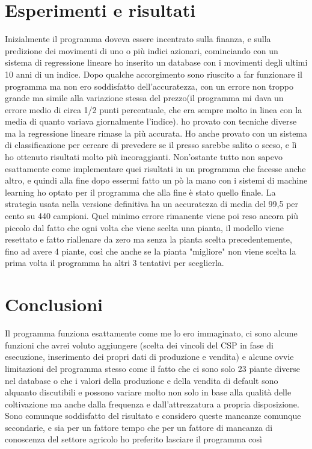 \documentclass[11pt]{article}
\begin{document}
\section{Esperimenti e risultati}
Inizialmente il programma doveva essere incentrato sulla finanza, e sulla predizione dei movimenti di uno o più indici azionari, cominciando con un sistema di regressione lineare ho inserito un database con i movimenti degli ultimi 10 anni di un indice. Dopo qualche accorgimento sono riuscito a far funzionare il programma ma non ero soddisfatto dell'accuratezza, con un errore non troppo grande ma simile alla variazione stessa del prezzo(il programma mi dava un errore medio di circa 1/2 punti percentuale, che era sempre molto in linea con la media di quanto variava giornalmente l'indice). ho provato con tecniche diverse ma la regressione lineare rimase la più accurata. Ho anche provato con un sistema di classificazione per cercare di prevedere se il presso sarebbe salito o sceso, e lì ho ottenuto risultati molto più incoraggianti. Non'ostante tutto non sapevo esattamente come implementare quei risultati in un programma che facesse anche altro, e quindi alla fine dopo essermi fatto un pò la mano con i sistemi di machine learning ho optato per il programma che alla fine è stato quello finale. La strategia usata nella versione definitiva ha un accuratezza di media del 99,5 per cento su 440 campioni. Quel minimo errore rimanente viene poi reso ancora più piccolo dal fatto che ogni volta che viene scelta una pianta, il modello viene resettato e fatto riallenare da zero ma senza la pianta scelta precedentemente, fino ad avere 4 piante, così che anche se la pianta "migliore" non viene scelta la prima volta il programma ha altri 3 tentativi per sceglierla. 

\section{Conclusioni}
Il programma funziona esattamente come me lo ero immaginato, ci sono alcune funzioni che avrei voluto aggiungere (scelta dei vincoli del CSP in fase di esecuzione, inserimento dei propri dati di produzione e vendita) e alcune ovvie limitazioni del programma stesso come il fatto che ci sono solo 23 piante diverse nel database o che i valori della produzione e della vendita di default sono alquanto discutibili e possono variare molto non solo in base alla qualità delle coltivazione ma anche dalla frequenza e dall'attrezzatura a propria disposizione. Sono comunque soddisfatto del risultato e considero queste mancanze comunque secondarie, e sia per un fattore tempo che per un fattore di mancanza di conoscenza del settore agricolo ho preferito lasciare il programma così 
\end{document}
